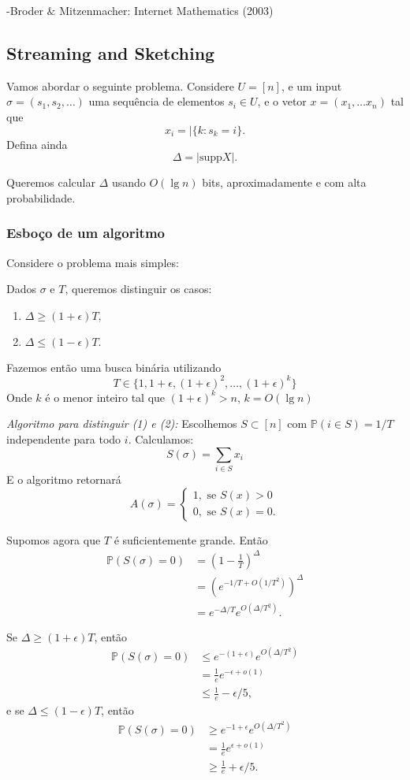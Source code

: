 -Broder $\&$ Mitzenmacher: Internet Mathematics (2003)

\subsection{Streaming and Sketching} Vamos abordar o seguinte problema. Considere $U=[n]$, e um input $\sigma = (s_1,s_2,\dots)$ uma sequ\^encia de elementos $s_i \in U$, e o vetor $x=(x_1,\dots x_n)$ tal que
\[x_i=|\{k:s_k=i\}.\]
Defina ainda 
\[\Delta = |\text{supp} X|.\] 

Queremos calcular $\Delta$ usando $O(\lg n)$ bits, aproximadamente e com alta probabilidade.

\subsubsection{Esbo\c{c}o de um algoritmo}
Considere o problema mais simples:

Dados $\sigma$ e $T$, queremos distinguir os casos:

\begin{enumerate}
\item $\Delta \ge (1+\epsilon)T,$
\item $\Delta \le (1-\epsilon)T.$
\end{enumerate}

Fazemos ent\~ao uma busca bin\'aria utilizando 
\[T \in \{1, 1+\epsilon, (1+\epsilon)^2, \dots, (1+\epsilon)^k\}\]
Onde $k$ \'e o menor inteiro tal que $(1+\epsilon)^k>n$, $k=O(\lg n)$

\textit{Algoritmo para distinguir (1) e (2):} Escolhemos $S\subset [n]$ com $\mathbb{P}(i \in S) = 1/T$ independente para todo $i$. Calculamos:
\[S(\sigma) = \sum_{i \in S} x_i\]
E o algoritmo retornará 
\[A(\sigma) = \begin{cases}
1, \text{ se } S(x)>0\\
0, \text{ se } S(x)=0.
\end{cases}\]

Supomos agora que $T$ \'e suficientemente grande. Ent\~ao
\begin{align*}
\mathbb{P}(S(\sigma)=0) &= \left(1 - \frac{1}{T} \right) ^\Delta\\
						&= \left(e^{ - 1/T +O(1/T^2)}\right) ^\Delta\\
						&= e^{-\Delta/T} e^{O(\Delta/T^2)}.
\end{align*}

Se $\Delta \ge (1+\epsilon)T$, ent\~ao
\begin{align*}
\mathbb{P}(S(\sigma) = 0) &\le e^{-(1+\epsilon)}e^{O(\Delta/T^2)}\\
						  &=\frac{1}{e} e^{-\epsilon + o(1)}\\
						  &\le \frac{1}{e} -\epsilon/5,
\end{align*}
e se $\Delta \le (1-\epsilon)T$, ent\~ao
\begin{align*}
\mathbb{P}(S(\sigma) = 0) &\ge e^{-1+\epsilon}e^{O(\Delta/T^2)}\\
						  &=\frac{1}{e} e^{\epsilon + o(1)}\\
						  &\ge \frac{1}{e} +\epsilon/5.
\end{align*}

